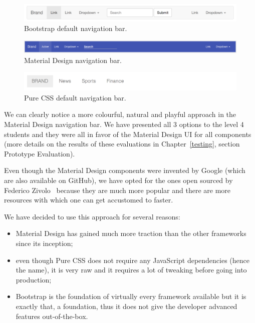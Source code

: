 \documentclass{l4proj}
\begin{document}
\begin{figure}[!ht]
    \centering
    \includegraphics[scale=0.35]{bootstrap-navbar}
    \caption{Bootstrap default navigation bar.}
    \label{fig:bootstrap-navbar}
\end{figure}

\begin{figure}[!ht]
    \centering
    \includegraphics[scale=0.35]{material-design-navbar}
    \caption{Material Design navigation bar.}
    \label{fig:material-design-navbar}
\end{figure}

\begin{figure}[!ht]
    \centering
    \includegraphics[scale=0.35]{purecss-navbar}
    \caption{Pure CSS default navigation bar.}
    \label{fig:purecss-navbar}
\end{figure}

We can clearly notice a more colourful, natural and playful approach in the Material Design navigation bar. We have
presented all 3 options to the level 4 students and they were all in favor of the Material Design UI for all components
(more details on the results of these evaluations in Chapter~\ref{testing}, section Prototype Evaluation).

Even though the Material Design components were invented by Google (which are also available on GitHub), we have opted for the ones open sourced by Federico
Zivolo~\cite{material-design} because they are much more popular and there are more resources with which one can get
accustomed to faster. 

We have decided to use this approach for several reasons:

\begin{itemize}
    \item Material Design has gained much more traction than the other frameworks since its inception;
    \item even though Pure CSS does not require any JavaScript dependencies (hence the name), it is very raw and it
	requires a lot of tweaking before going into production;
    \item Bootstrap is the foundation of virtually every framework available but it is exactly that, a foundation, thus
	it does not give the developer advanced features out-of-the-box.
\end{itemize}
\end{document}
